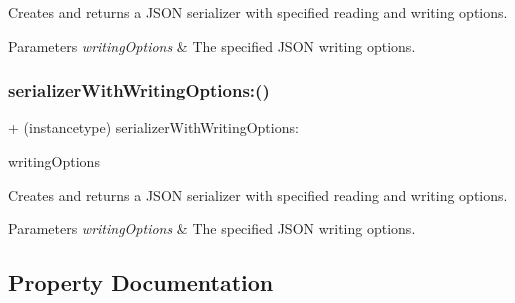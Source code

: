 Creates and returns a J\+S\+ON serializer with specified reading and writing options.


\begin{DoxyParams}{Parameters}
{\em writing\+Options} & The specified J\+S\+ON writing options. \\
\hline
\end{DoxyParams}
\mbox{\label{interface_a_f_j_s_o_n_request_serializer_a53962511f37e48990159af5bc8959c30}} 
\subsubsection{\texorpdfstring{serializer\+With\+Writing\+Options\+:()}{serializerWithWritingOptions:()}\hspace{0.1cm}{\footnotesize\ttfamily [3/3]}}
{\footnotesize\ttfamily + (instancetype) serializer\+With\+Writing\+Options\+: \begin{DoxyParamCaption}\item[{(N\+S\+J\+S\+O\+N\+Writing\+Options)}]{writing\+Options }\end{DoxyParamCaption}}

Creates and returns a J\+S\+ON serializer with specified reading and writing options.


\begin{DoxyParams}{Parameters}
{\em writing\+Options} & The specified J\+S\+ON writing options. \\
\hline
\end{DoxyParams}


\subsection{Property Documentation}
\mbox{\label{interface_a_f_j_s_o_n_request_serializer_ab69cc530353247cdd51d60279acc4e55}} 
